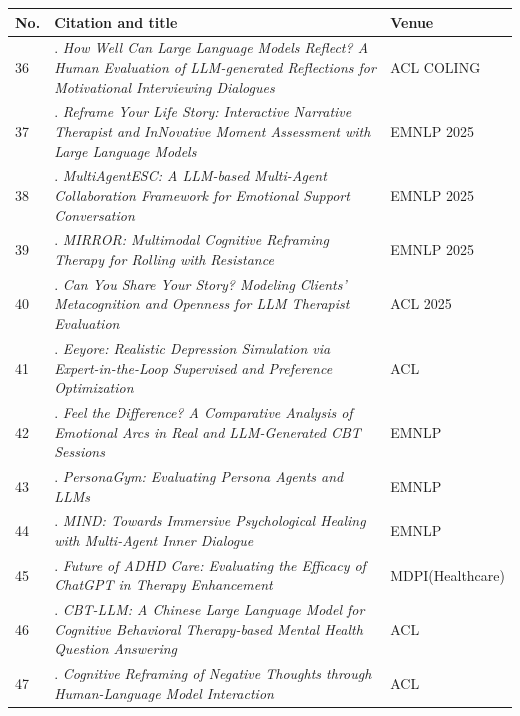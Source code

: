 \begin{table}[p]
\centering
\begin{tabular}{p{0.8cm}p{11.1cm}p{3.0cm}}
\toprule
\textbf{No.} & \textbf{Citation and title} & \textbf{Venue} \\
\midrule
36 &
\citealp{Basar2025How}. \textit{How Well Can Large Language Models Reflect? A Human Evaluation of LLM-generated Reflections for Motivational Interviewing Dialogues} &
ACL COLING \\
\midrule
37 &
\citealp{Feng2025Reframe}. \textit{Reframe Your Life Story: Interactive Narrative Therapist and InNovative Moment Assessment with Large Language Models} &
EMNLP 2025 \\
\midrule
38 &
\citealp{Xu2025MultiAgentESC}. \textit{MultiAgentESC: A LLM-based Multi-Agent Collaboration Framework for Emotional Support Conversation} &
EMNLP 2025 \\
\midrule
39 &
\citealp{Kim2025MIRROR}. \textit{MIRROR: Multimodal Cognitive Reframing Therapy for Rolling with Resistance} &
EMNLP 2025 \\
\midrule
40 &
\citealp{Kim2025Can}. \textit{Can You Share Your Story? Modeling Clients' Metacognition and Openness for LLM Therapist Evaluation} &
ACL 2025 \\
\midrule
41 &
\citealp{Liu2025Eeyore}. \textit{Eeyore: Realistic Depression Simulation via Expert-in-the-Loop Supervised and Preference Optimization} &
ACL \\
\midrule
42 &
\citealp{Wang2025Feel}. \textit{Feel the Difference? A Comparative Analysis of Emotional Arcs in Real and LLM-Generated CBT Sessions} &
EMNLP \\
\midrule
43 &
\citealp{Samuel2025PersonaGym}. \textit{PersonaGym: Evaluating Persona Agents and LLMs} &
EMNLP \\
\midrule
44 &
\citealp{Chen2025MIND}. \textit{MIND: Towards Immersive Psychological Healing with Multi-Agent Inner Dialogue} &
EMNLP \\
\midrule
45 &
\citealp{Berrezueta-Guzman2024Future}. \textit{Future of ADHD Care: Evaluating the Efficacy of ChatGPT in Therapy Enhancement} &
MDPI(Healthcare) \\
\midrule
46 &
\citealp{Na2024CBT-LLM}. \textit{CBT-LLM: A Chinese Large Language Model for Cognitive Behavioral Therapy-based Mental Health Question Answering} &
ACL \\
\midrule
47 &
\citealp{Sharma2023Cognitive}. \textit{Cognitive Reframing of Negative Thoughts through Human-Language Model Interaction} &
ACL \\

\end{tabular}
\end{table}
